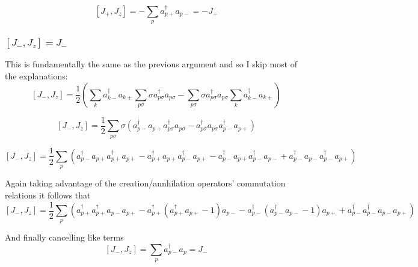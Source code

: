 \documentclass[11pt]{article} %
\begin{document}
\begin{equation}
\left[J_+,J_z\right]=-\sum_{p} a_{p+}^\dagger a_{p-}=-J_+
\end{equation}


\subsubsection{$\left[J_-,J_z\right]=J_-$}

This is fundamentally the same as the previous argument and so I skip most of the explanations:\\


\begin{equation}
\left[J_-,J_z\right]=\frac{1}{2} \left( \sum_k a_{k-}^\dagger a_{k+} \sum_{p\sigma}\sigma a_{p\sigma}^\dagger a_{p\sigma}- \sum_{p\sigma}\sigma a_{p\sigma}^\dagger a_{p\sigma}\sum_k a_{k-}^\dagger a_{k+}\right)
\end{equation}


\begin{equation}
\left[J_-,J_z\right]=\frac{1}{2}\sum_{p\sigma} \sigma \left( a_{p-}^\dagger a_{p+}  a_{p\sigma}^\dagger a_{p\sigma}-  a_{p\sigma}^\dagger a_{p\sigma} a_{p-}^\dagger a_{p+}\right)
\end{equation}



\begin{equation}
\left[J_-,J_z\right]=\frac{1}{2}\sum_{p}  \left( a_{p-}^\dagger a_{p+}  a_{p+}^\dagger a_{p+}-  a_{p+}^\dagger a_{p+} a_{p-}^\dagger a_{p+}  - a_{p-}^\dagger a_{p+}  a_{p-}^\dagger a_{p-}+  a_{p-}^\dagger a_{p-} a_{p-}^\dagger a_{p+} \right)
\end{equation}


Again taking advantage of the creation/annhilation operators' commutation relations it follows that\\


\begin{equation}
\left[J_-,J_z\right]=\frac{1}{2}\sum_{p}  \left( a_{p+}^\dagger  a_{p+}^\dagger a_{p-} a_{p+}-  a_{p+}^\dagger (a_{p+}^\dagger a_{p+}-1) a_{p-}  - a_{p-}^\dagger  (a_{p-}^\dagger a_{p-}-1)  a_{p+}+   a_{p-}^\dagger a_{p-}^\dagger a_{p-} a_{p+} \right)
\end{equation}

And finally cancelling like terms\\


\begin{equation}
\left[J_-,J_z\right]=\sum_{p} a_{p-}^\dagger a_{p}=J_-
\end{equation}
\end{document}
